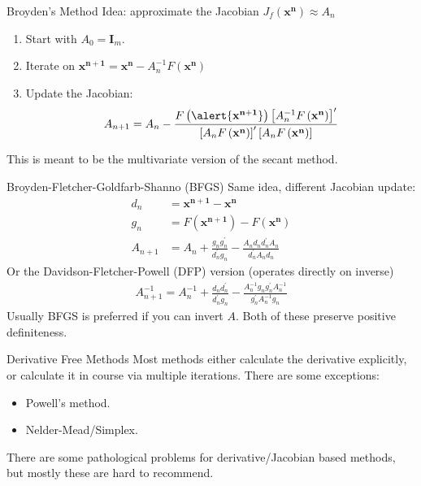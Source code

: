 \begin{frame}{Broyden's Method}
Idea: approximate the Jacobian $J_f(\mathbf{x^n}) \approx A_n$
\begin{enumerate}
\item Start with $A_0 = \mathbf{I}_m$.
\item Iterate on $\mathbf{x^{n+1}}= \mathbf{x^n} - A_n^{-1} F\left(\mathbf{x^{n}}\right)$
\item Update the Jacobian:
\begin{align*}
A_{n+1}=A_{n}-\frac{F\left(\alert{\mathbf{x^{n+1}}}\right)\left[A_{n}^{-1}  F\left(\mathbf{x^{n}}\right) \right]^{\prime}}{\left[A_{n} F\left(\mathbf{x^{n}}\right) \right]^{\prime}\left[A_{n} F\left(\mathbf{x^{n}}\right) \right]}
\end{align*}
\end{enumerate}
This is meant to be the multivariate version of the \alert{secant method}.
\end{frame} 



\begin{frame}{Broyden-Fletcher-Goldfarb-Shanno (BFGS)}
Same idea, different Jacobian update:
\begin{align*}
d_n &= \mathbf{x^{n+1}} - \mathbf{x^n} \\
g_n &= F(\mathbf{x^{n+1}}) -F(\mathbf{x^n}) \\
A_{n+1}&=A_{n}+\frac{g_{n} g_{n}^{\prime}}{d_{n}^{\prime} g_{n}}-\frac{A_{n} d_{n} d_{n}^{\prime} A_{n}}{d_{n}^{\prime} A_{n} d_{n}}
\end{align*}
Or the Davidson-Fletcher-Powell (DFP) version (operates directly on inverse)
\begin{align*}
A_{n+1}^{-1}=A_{n}^{-1}+\frac{d_{n} d_{n}^{\prime}}{d_{n}^{\prime} g_{n}}-\frac{A_{n}^{-1} g_{n} g_{n}^{\prime} A_{n}^{-1}}{g_{n}^{\prime} A_{n}^{-1} g_{n}}
\end{align*}
Usually BFGS is preferred if you can invert $A$. Both of these preserve \alert{positive definiteness}.
\end{frame} 

\begin{frame}{Derivative Free Methods}
Most methods either calculate the derivative explicitly, or calculate it in course via multiple iterations. There are some exceptions:
\begin{itemize}
\item Powell's method.
\item Nelder-Mead/Simplex.
\end{itemize}
There are some pathological problems for derivative/Jacobian based methods, but mostly these are hard to recommend.
\end{frame} 


